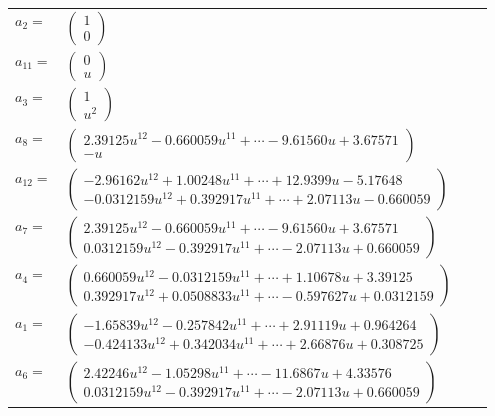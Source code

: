 \documentclass[1p]{elsarticle_modified}
\theoremstyle{definition}
\begin{document}
\begin{tabular}{m{7pt} m{180pt} m{7pt} m{180pt} }
\flushright $a_{2}=$&$\begin{pmatrix}1\\0\end{pmatrix}$ \\
\flushright $a_{11}=$&$\begin{pmatrix}0\\u\end{pmatrix}$ \\
\flushright $a_{3}=$&$\begin{pmatrix}1\\u^2\end{pmatrix}$ \\
\flushright $a_{8}=$&$\begin{pmatrix}2.39125 u^{12}-0.660059 u^{11}+\cdots-9.61560 u+3.67571\\- u\end{pmatrix}$ \\
\flushright $a_{12}=$&$\begin{pmatrix}-2.96162 u^{12}+1.00248 u^{11}+\cdots+12.9399 u-5.17648\\-0.0312159 u^{12}+0.392917 u^{11}+\cdots+2.07113 u-0.660059\end{pmatrix}$ \\
\flushright $a_{7}=$&$\begin{pmatrix}2.39125 u^{12}-0.660059 u^{11}+\cdots-9.61560 u+3.67571\\0.0312159 u^{12}-0.392917 u^{11}+\cdots-2.07113 u+0.660059\end{pmatrix}$ \\
\flushright $a_{4}=$&$\begin{pmatrix}0.660059 u^{12}-0.0312159 u^{11}+\cdots+1.10678 u+3.39125\\0.392917 u^{12}+0.0508833 u^{11}+\cdots-0.597627 u+0.0312159\end{pmatrix}$ \\
\flushright $a_{1}=$&$\begin{pmatrix}-1.65839 u^{12}-0.257842 u^{11}+\cdots+2.91119 u+0.964264\\-0.424133 u^{12}+0.342034 u^{11}+\cdots+2.66876 u+0.308725\end{pmatrix}$ \\
\flushright $a_{6}=$&$\begin{pmatrix}2.42246 u^{12}-1.05298 u^{11}+\cdots-11.6867 u+4.33576\\0.0312159 u^{12}-0.392917 u^{11}+\cdots-2.07113 u+0.660059\end{pmatrix}$ \\

\end{tabular}
\end{document}
